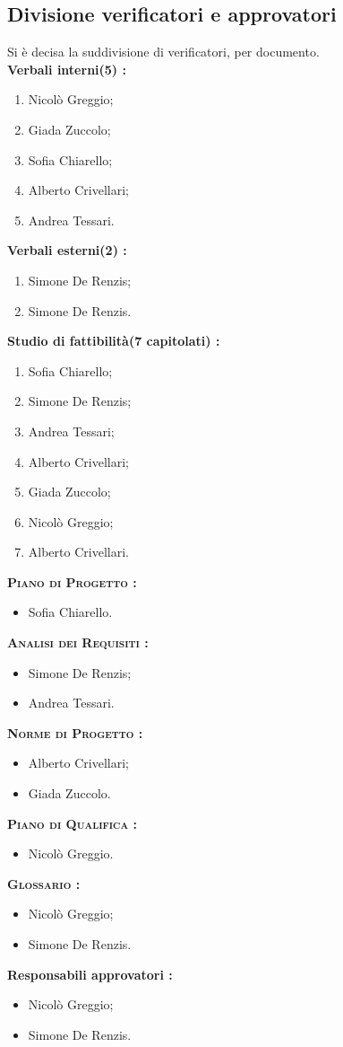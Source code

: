 \subsection{Divisione verificatori e approvatori}
Si è decisa la suddivisione di verificatori, per documento.\\
\textbf{Verbali interni(5) :}
\begin{enumerate}
	\item Nicolò Greggio;
	\item Giada Zuccolo;
	\item Sofia Chiarello;
	\item Alberto Crivellari;
	\item Andrea Tessari.
\end{enumerate}
\textbf{Verbali esterni(2) :}
\begin{enumerate}
	\item Simone De Renzis;
	\item Simone De Renzis.
\end{enumerate}
\textbf{Studio di fattibilità(7 capitolati) :}
\begin{enumerate}
	\item Sofia Chiarello;
	\item Simone De Renzis;
	\item Andrea Tessari;
	\item Alberto Crivellari;
	\item Giada Zuccolo;
	\item Nicolò Greggio;
	\item Alberto Crivellari.
\end{enumerate}
\textbf{\textsc{Piano di Progetto :}}
\begin{itemize}
	\item Sofia Chiarello.
\end{itemize}
\textbf{\textsc{Analisi dei Requisiti :}}
\begin{itemize}
	\item Simone De Renzis;
	\item Andrea Tessari.
\end{itemize}
\textbf{\textsc{Norme di Progetto :}}
\begin{itemize}
	\item Alberto Crivellari;
	\item Giada Zuccolo.
\end{itemize}
\textbf{\textsc{Piano di Qualifica :}}
\begin{itemize}
	\item Nicolò Greggio.
\end{itemize}
\textbf{\textsc{Glossario :}}
\begin{itemize}
	\item Nicolò Greggio;
	\item Simone De Renzis.
\end{itemize}
\textbf{Responsabili approvatori :}
\begin{itemize}
	\item Nicolò Greggio;
	\item Simone De Renzis.
\end{itemize}
